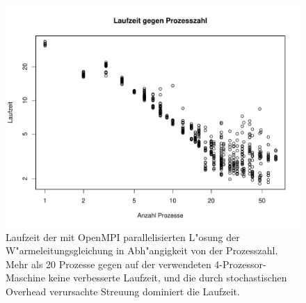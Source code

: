 \begin{figure}
\begin{center}
\includegraphics[width=\hsize]{heat/results-heat-threads.pdf}
\end{center}
\caption{Laufzeit der mit OpenMPI parallelisierten L"osung der
W"armeleitungsgleichung in Abh"angigkeit von der Prozesszahl.
Mehr als 20 Prozesse gegen auf der verwendeten 4-Prozessor-Maschine
keine verbesserte Laufzeit, und die durch stochastischen
Overhead verursachte Streuung dominiert die Laufzeit.
\label{heat:threadzahl}}
\end{figure}


